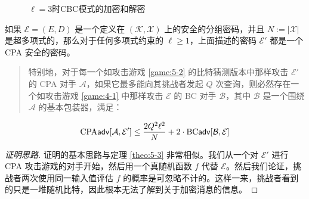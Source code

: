 \begin{figure}[p!]
  \centering

  \caption{$\ell=3$时CBC模式的加密和解密}
  \label{fig:5-4}
\end{figure}

\begin{theorem}\label{theo:5-4}
如果 $\mathcal{E}=(E,D)$ 是一个定义在 $(\mathcal{K},\mathcal{X})$ 上的安全的分组密码，并且 $N:=|\mathcal{X}|$ 是超多项式的，那么对于任何多项式约束的 $\ell\geq1$，上面描述的密码 $\mathcal{E}'$ 都是一个 CPA 安全的密码。
\begin{quote}
特别地，对于每一个如攻击游戏 \ref{game:5-2} 的比特猜测版本中那样攻击 $\mathcal{E}'$ 的 CPA 对手 $\mathcal{A}$，如果它最多能向其挑战者发起 $Q$ 次查询，则必然存在一个如攻击游戏 \ref{game:4-1} 中那样攻击 $\mathcal{E}$ 的 BC 对手 $\mathcal{B}$，其中 $\mathcal{B}$ 是一个围绕 $\mathcal{A}$ 的基本包装器，满足：
\end{quote}
\begin{equation}\label{eq:5-22}
{\rm CPA}\mathsf{adv}[\mathcal{A},\mathcal{E}']\leq\frac{2Q^2\ell^2}{N}+2\cdot{\rm BC\mathsf{adv}}[\mathcal{B},\mathcal{E}]
\end{equation}
\end{theorem}

\begin{proof}[证明思路]
证明的基本思路与定理 \ref{theo:5-3} 非常相似。我们从一个对 $\mathcal{E}'$ 进行 CPA 攻击游戏的对手开始，然后用一个真随机函数 $f$ 代替 $\mathcal{E}$。然后我们论证，挑战者两次使用同一输入值评估 $f$ 的概率是可忽略不计的。这样一来，挑战者看到的只是一堆随机比特，因此根本无法了解到关于加密消息的信息。
\end{proof}

